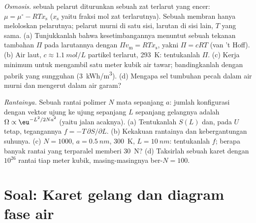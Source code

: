 \begin{exercise}[$\star\star\star$]\label{exo:b2:thermodynamic-potentials:11}
\emph{Osmosis.}  sebuah pelarut diturunkan sebuah
zat terlarut yang encer: $\mu = \mu^\circ - RTx_{\text{s}}$ ($x_{\text{s}}$ yaitu fraksi
mol zat terlarutnya). Sebuah membran hanya meloloskan pelarutnya; pelarut murni di
satu sisi, larutan di sisi lain, $T$ yang sama. (a) Tunjukkanlah bahwa kesetimbangannya
menuntut sebuah tekanan tambahan $\Pi$ pada larutannya dengan $\Pi v_{\text{m}} =
RTx_{\text{s}}$, yakni $\Pi = cRT$ (van 't Hoff). (b) Air laut, $c \approx
\qty{1.1}{mol/L}$ partikel terlarut, \qty{293}{K}: tentukanlah $\Pi$. (c) Kerja minimum
untuk mengambil satu meter kubik air tawar; bandingkanlah dengan pabrik yang sungguhan
(\qty{3}{kWh/m^3}). (d) Mengapa sel tumbuhan pecah dalam air murni dan
mengerut dalam air garam?
\end{exercise}

\begin{exercise}[$\star\star\star$]\label{exo:b2:thermodynamic-potentials:12}
\emph{Rantainya.} Sebuah rantai polimer $N$ mata sepanjang $a$: jumlah
konfigurasi dengan vektor ujung ke ujung sepanjang $L$ sepanjang
gelangnya adalah $\Omega \propto \eu^{-L^2/2Na^2}$ (yaitu jalan acaknya). (a) Tentukanlah $S(L)$
dan, pada $U$ tetap, tegangannya $f = -T\,\partial S/\partial L$. (b) Kekakuan
rantainya dan kebergantungan suhunya. (c) $N = 1000$, $a =
\qty{0.5}{nm}$, \qty{300}{K}, $L = \qty{10}{nm}$: tentukanlah $f$; berapa banyak rantai yang
terparalel memberi \qty{30}{N}? (d) Taksirlah  sebuah karet
dengan $10^{26}$ rantai tiap meter kubik, masing-masingnya ber-$N = 100$.
\end{exercise}

\section{Soal: Karet gelang dan diagram fase air}

